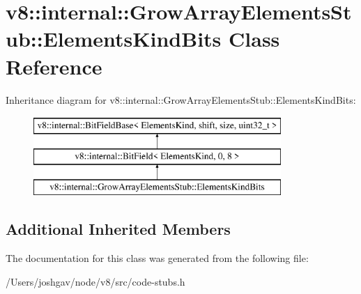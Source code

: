 \hypertarget{classv8_1_1internal_1_1_grow_array_elements_stub_1_1_elements_kind_bits}{}\section{v8\+:\+:internal\+:\+:Grow\+Array\+Elements\+Stub\+:\+:Elements\+Kind\+Bits Class Reference}
\label{classv8_1_1internal_1_1_grow_array_elements_stub_1_1_elements_kind_bits}
Inheritance diagram for v8\+:\+:internal\+:\+:Grow\+Array\+Elements\+Stub\+:\+:Elements\+Kind\+Bits\+:\begin{figure}[H]
\begin{center}
\leavevmode
\includegraphics[height=3.000000cm]{classv8_1_1internal_1_1_grow_array_elements_stub_1_1_elements_kind_bits}
\end{center}
\end{figure}
\subsection*{Additional Inherited Members}


The documentation for this class was generated from the following file\+:\begin{DoxyCompactItemize}
\item 
/\+Users/joshgav/node/v8/src/code-\/stubs.\+h\end{DoxyCompactItemize}
